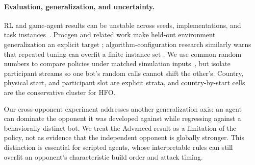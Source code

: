 \paragraph{Evaluation, generalization, and uncertainty.}
RL and game-agent results can be unstable across seeds, implementations, and
task instances~\cite{henderson2018matters,agarwal2021precipice}. Procgen and
related work make held-out environment generalization an explicit target
\cite{cobbe2019coinrun,cobbe2020procgen}; algorithm-configuration research
similarly warns that repeated tuning can overfit a finite instance set
\cite{eggensperger2019pitfalls}. We use common random numbers to compare
policies under matched simulation inputs~\cite{schruben2011crn}, but isolate
participant streams so one bot's random calls cannot shift the other's.
Country, physical start, and participant slot are explicit strata, and
country-by-start cells are the conservative cluster for HFO.

Our cross-opponent experiment addresses another generalization axis: an agent
can dominate the opponent it was developed against while regressing against a
behaviorally distinct bot. We treat the Advanced result as a limitation of the
policy, not as evidence that the independent opponent is globally stronger.
This distinction is essential for scripted agents, whose interpretable rules
can still overfit an opponent's characteristic build order and attack timing.
